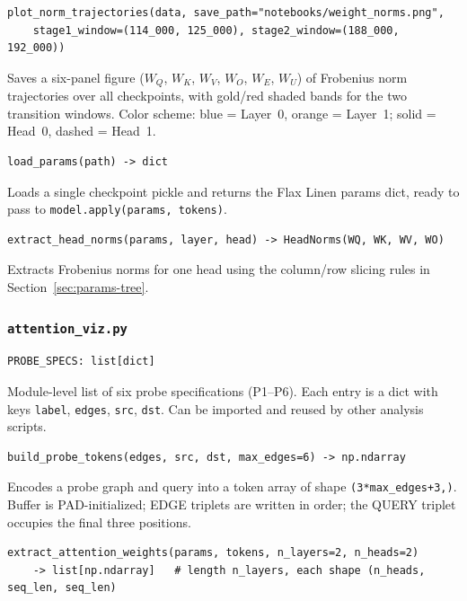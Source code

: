 \documentclass[11pt, a4paper]{article}
\begin{document}
\begin{lstlisting}
plot_norm_trajectories(data, save_path="notebooks/weight_norms.png",
    stage1_window=(114_000, 125_000), stage2_window=(188_000, 192_000))
\end{lstlisting}

Saves a six-panel figure ($W_Q$, $W_K$, $W_V$, $W_O$, $W_E$, $W_U$) of
Frobenius norm trajectories over all checkpoints, with gold/red shaded bands
for the two transition windows. Color scheme: blue = Layer~0, orange = Layer~1;
solid = Head~0, dashed = Head~1.

\begin{lstlisting}
load_params(path) -> dict
\end{lstlisting}

Loads a single checkpoint pickle and returns the Flax Linen params dict, ready
to pass to \texttt{model.apply(params, tokens)}.

\begin{lstlisting}
extract_head_norms(params, layer, head) -> HeadNorms(WQ, WK, WV, WO)
\end{lstlisting}

Extracts Frobenius norms for one head using the column/row slicing rules in
Section~\ref{sec:params-tree}.

\subsubsection{\texttt{attention\_viz.py}}

\begin{lstlisting}
PROBE_SPECS: list[dict]
\end{lstlisting}

Module-level list of six probe specifications (P1--P6). Each entry is a dict
with keys \texttt{label}, \texttt{edges}, \texttt{src}, \texttt{dst}. Can be
imported and reused by other analysis scripts.

\begin{lstlisting}
build_probe_tokens(edges, src, dst, max_edges=6) -> np.ndarray
\end{lstlisting}

Encodes a probe graph and query into a token array of shape
\texttt{(3*max\_edges+3,)}. Buffer is PAD-initialized; EDGE triplets are
written in order; the QUERY triplet occupies the final three positions.

\begin{lstlisting}
extract_attention_weights(params, tokens, n_layers=2, n_heads=2)
    -> list[np.ndarray]   # length n_layers, each shape (n_heads, seq_len, seq_len)
\end{lstlisting}
\end{document}
